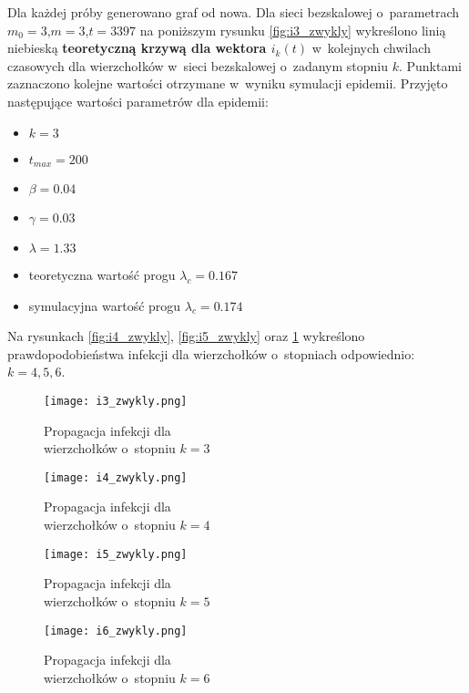 \begin{enumerate}
Dla każdej próby generowano graf od nowa. Dla sieci bezskalowej o~parametrach $m_0 = 3$,$m = 3$,$t = 3397$ na poniższym rysunku \ref{fig:i3_zwykly} wykreślono linią niebieską \textbf{teoretyczną krzywą dla wektora $i_k(t)$} w~kolejnych chwilach czasowych dla wierzchołków w~sieci bezskalowej o~zadanym stopniu $k$. Punktami zaznaczono kolejne wartości otrzymane w~wyniku symulacji epidemii. Przyjęto następujące wartości parametrów dla epidemii:
\begin{itemize}[nolistsep]
\item $k = 3$
\item $t_{max} = 200$
\item $\beta = 0.04$
\item $\gamma = 0.03$
\item $\lambda = 1.33$
\item teoretyczna wartość progu $\lambda_c = 0.167$
\item symulacyjna wartość progu $\lambda_c = 0.174$
\end{itemize}

Na rysunkach \ref{fig:i4_zwykly}, \ref{fig:i5_zwykly} oraz \ref{fig:i6_zwykly} wykreślono prawdopodobieństwa infekcji dla wierzchołków o~stopniach odpowiednio: $k=4,5,6$.

\begin{figure}
\centering
\begin{minipage}[H]{0.45\textwidth}
  \centering
  \texttt{[image: i3\_zwykly.png]}
  \caption{\small Propagacja infekcji dla \\ wierzchołków o~stopniu $k=3$}
  \label{fig:i3_zwykly}
\end{minipage} 
\begin{minipage}[H]{0.45\textwidth}
  \centering
  \texttt{[image: i4\_zwykly.png]}
  \caption{\small Propagacja infekcji dla \\ wierzchołków o~stopniu $k=4$}
  \label{fig:i4_zwykly}
\end{minipage} 
\begin{minipage}[H]{0.45\textwidth}
  \centering
  \texttt{[image: i5\_zwykly.png]}
  \caption{\small Propagacja infekcji dla \\ wierzchołków o~stopniu $k=5$}
  \label{fig:i5_zwykly}
\end{minipage}
\begin{minipage}[ht]{0.45\textwidth}
  \centering
  \texttt{[image: i6\_zwykly.png]}
  \caption{\small Propagacja infekcji dla \\ wierzchołków o~stopniu $k=6$}
  \label{fig:i6_zwykly}
\end{minipage}
\end{figure}


\end{enumerate}
